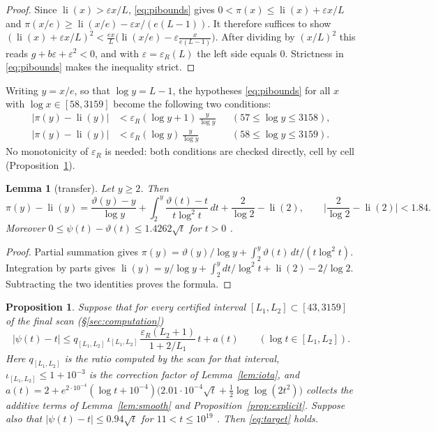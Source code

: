 \documentclass[11pt]{amsart}
\numberwithin{equation}{section}
\newtheorem{lemma}[theorem]{Lemma}
\newtheorem{proposition}[theorem]{Proposition}
\theoremstyle{definition}
\theoremstyle{remark}
\newcommand{\li}{\operatorname{li}}
\newcommand{\eps}{\varepsilon}
\begin{document}
\begin{proof}
Since $\li(x) > \eps x/L$, \eqref{eq:pibounds} gives $0 < \pi(x) \le \li(x) + \eps x/L$ and $\pi(x/e) \ge \li(x/e) - \eps x/(e(L-1))$.
It therefore suffices to show
$(\li(x) + \eps x/L)^2 < \frac{ex}{L}\big(\li(x/e) - \eps\frac{x}{e(L-1)}\big)$.
After dividing by $(x/L)^2$ this reads $g + b\eps + \eps^2 < 0$, and with $\eps = \eps_R(L)$ the left side equals $0$.
Strictness in \eqref{eq:pibounds} makes the inequality strict.
\end{proof}

Writing $y = x/e$, so that $\log y = L - 1$, the hypotheses \eqref{eq:pibounds} for all $x$ with $\log x \in [58, 3159]$ become the following two conditions:
\begin{equation}\label{eq:target}
\begin{aligned}
|\pi(y) - \li(y)| &< \eps_R(\log y + 1)\,\frac{y}{\log y} &&(57 \le \log y \le 3158),\\
|\pi(y) - \li(y)| &< \eps_R(\log y)\,\frac{y}{\log y} &&(58 \le \log y \le 3159).
\end{aligned}
\end{equation}
No monotonicity of $\eps_R$ is needed: both conditions are checked directly, cell by cell (Proposition~\ref{prop:transfer}).

\begin{lemma}[transfer]\label{lem:transfer}
Let $y \ge 2$.
Then
\[
\pi(y) - \li(y) = \frac{\vartheta(y) - y}{\log y} + \int_2^y \frac{\vartheta(t) - t}{t\log^2 t}\,dt + \frac{2}{\log 2} - \li(2),
\qquad \Big|\frac{2}{\log 2} - \li(2)\Big| < 1.84.
\]
Moreover $0 \le \psi(t) - \vartheta(t) \le 1.4262\sqrt t$ for $t > 0$ \cite[Thm.~13]{RS62}.
\end{lemma}

\begin{proof}
Partial summation gives $\pi(y) = \vartheta(y)/\log y + \int_2^y \vartheta(t)\,dt/(t\log^2 t)$.
Integration by parts gives $\li(y) = y/\log y + \int_2^y dt/\log^2 t + \li(2) - 2/\log 2$.
Subtracting the two identities proves the formula.
\end{proof}

\begin{proposition}\label{prop:transfer}
Suppose that for every certified interval $[L_1, L_2] \subset [43, 3159]$ of the final scan (\S\ref{sec:computation})
\begin{equation}\label{eq:psicert}
|\psi(t) - t| \le q_{[L_1,L_2]}\,\iota_{[L_1,L_2]}\,\frac{\eps_R(L_2+1)}{1 + 2/L_1}\, t + a(t) \qquad (\log t \in [L_1, L_2]).
\end{equation}
Here $q_{[L_1,L_2]}$ is the ratio computed by the scan for that interval, $\iota_{[L_1,L_2]} \le 1 + 10^{-3}$ is the correction factor of Lemma~\ref{lem:iota}, and $a(t) = 2 + e^{2\cdot 10^{-4}}(\log t + 10^{-4})\big(2.01\cdot 10^{-4}\sqrt t + \tfrac12\log\log(2t^2)\big)$ collects the additive terms of Lemma~\ref{lem:smooth} and Proposition~\ref{prop:explicit}.
Suppose also that $|\psi(t) - t| \le 0.94\sqrt t$ for $11 < t \le 10^{19}$ \cite[Thm.~2]{Buthe2018}.
Then \eqref{eq:target} holds.
\end{proposition}
\end{document}
